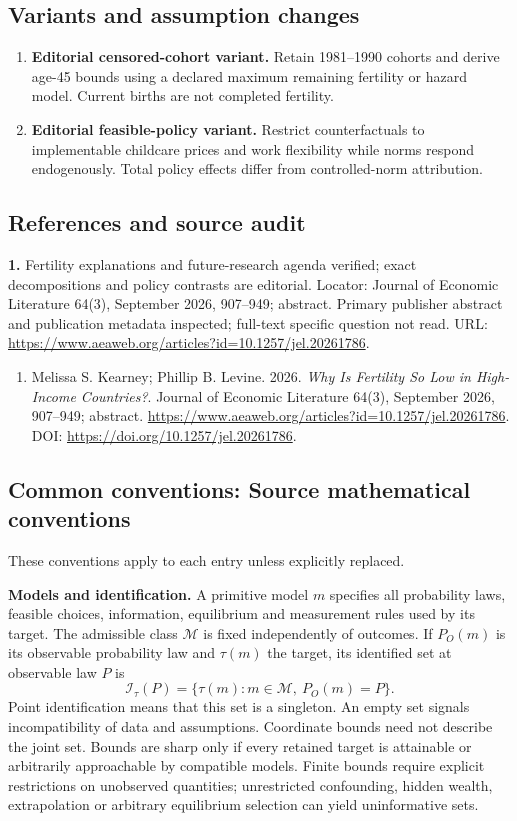 \documentclass[11pt,a4paper]{article}
\begin{document}
\subsection*{Variants and assumption changes}
\begin{enumerate}
\item \textbf{Editorial censored-cohort variant.} Retain 1981–1990 cohorts and derive age-45 bounds using a declared maximum remaining fertility or hazard model. Current births are not completed fertility.
\item \textbf{Editorial feasible-policy variant.} Restrict counterfactuals to implementable childcare prices and work flexibility while norms respond endogenously. Total policy effects differ from controlled-norm attribution.
\end{enumerate}
\subsection*{References and source audit}
\textbf{1.} Fertility explanations and future-research agenda verified; exact decompositions and policy contrasts are editorial. Locator: Journal of Economic Literature 64(3), September 2026, 907–949; abstract. Primary publisher abstract and publication metadata inspected; full-text specific question not read. URL: \url{https://www.aeaweb.org/articles?id=10.1257/jel.20261786}.
\begin{enumerate}\raggedright
\item\hypertarget{definitions:source:30007737:1}{} Melissa S. Kearney; Phillip B. Levine. 2026. \emph{Why Is Fertility So Low in High-Income Countries?}. Journal of Economic Literature 64(3), September 2026, 907–949; abstract.
\url{https://www.aeaweb.org/articles?id=10.1257/jel.20261786}.
DOI: \url{https://doi.org/10.1257/jel.20261786}.
\end{enumerate}

\subsection*{Common conventions: Source mathematical conventions}

These conventions apply to each entry unless explicitly replaced.

\textbf{Models and identification.} A primitive model \(m\) specifies all probability laws, feasible choices, information, equilibrium and measurement rules used by its target. The admissible class \(\mathcal M\) is fixed independently of outcomes. If \(P_O(m)\) is its observable probability law and \(\tau(m)\) the target, its identified set at observable law \(P\) is
\[
 \mathcal I_\tau(P)=\{\tau(m):m\in\mathcal M,\ P_O(m)=P\}.
\]
Point identification means that this set is a singleton. An empty set signals incompatibility of data and assumptions. Coordinate bounds need not describe the joint set. Bounds are sharp only if every retained target is attainable or arbitrarily approachable by compatible models. Finite bounds require explicit restrictions on unobserved quantities; unrestricted confounding, hidden wealth, extrapolation or arbitrary equilibrium selection can yield uninformative sets.
\end{document}
